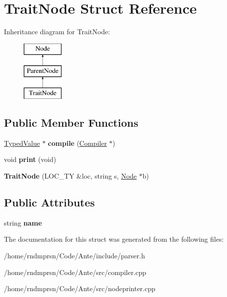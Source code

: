\hypertarget{structTraitNode}{}\section{Trait\+Node Struct Reference}
\label{structTraitNode}
Inheritance diagram for Trait\+Node\+:\begin{figure}[H]
\begin{center}
\leavevmode
\includegraphics[height=3.000000cm]{structTraitNode}
\end{center}
\end{figure}
\subsection*{Public Member Functions}
\begin{DoxyCompactItemize}
\item 
\mbox{\label{structTraitNode_afa71e33c1ad788daa2c80f2183c46d9c}} 
\hyperlink{structTypedValue}{Typed\+Value} $\ast$ {\bfseries compile} (\hyperlink{structante_1_1Compiler}{Compiler} $\ast$)
\item 
\mbox{\label{structTraitNode_a02346fd07c8b8958fa8620e5b64dc4be}} 
void {\bfseries print} (void)
\item 
\mbox{\label{structTraitNode_aeadb33930fe6758658f8b74cef96277f}} 
{\bfseries Trait\+Node} (L\+O\+C\+\_\+\+TY \&loc, string s, \hyperlink{structNode}{Node} $\ast$b)
\end{DoxyCompactItemize}
\subsection*{Public Attributes}
\begin{DoxyCompactItemize}
\item 
\mbox{\label{structTraitNode_a461db5dba441516fc36a27cc70a88340}} 
string {\bfseries name}
\end{DoxyCompactItemize}


The documentation for this struct was generated from the following files\+:\begin{DoxyCompactItemize}
\item 
/home/rndmprsn/\+Code/\+Ante/include/parser.\+h\item 
/home/rndmprsn/\+Code/\+Ante/src/compiler.\+cpp\item 
/home/rndmprsn/\+Code/\+Ante/src/nodeprinter.\+cpp\end{DoxyCompactItemize}
